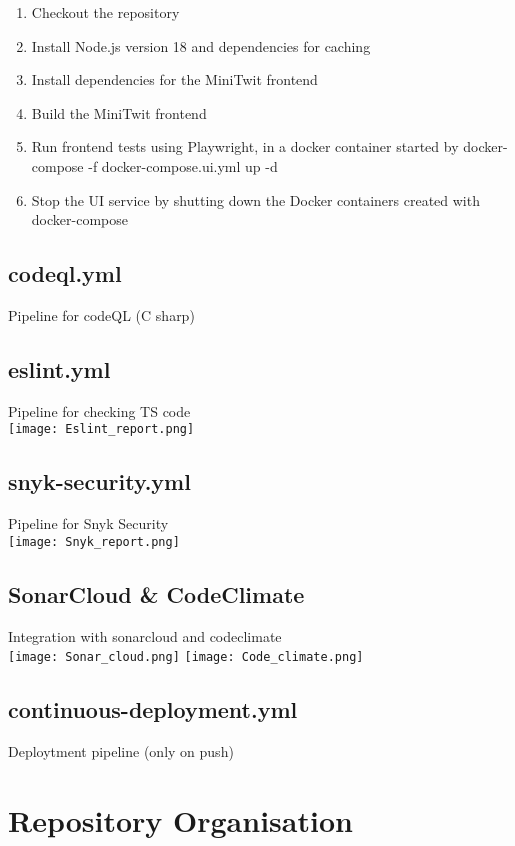 \begin{enumerate}
    \item Checkout the repository
    \item Install Node.js version 18 and dependencies for caching
    \item Install dependencies for the MiniTwit frontend
    \item Build the MiniTwit frontend
    \item Run frontend tests using Playwright, in a docker container started by docker-compose -f docker-compose.ui.yml up -d
    \item Stop the UI service by shutting down the Docker containers created with docker-compose
\end{enumerate}

\subsection{codeql.yml}
Pipeline for codeQL (C sharp) 

\subsection{eslint.yml}
Pipeline for checking TS code\\
\texttt{[image: Eslint\_report.png]}

\subsection{snyk-security.yml}
Pipeline for Snyk Security\\
\texttt{[image: Snyk\_report.png]}

\subsection{SonarCloud \& CodeClimate}
Integration with sonarcloud and codeclimate \\

\texttt{[image: Sonar\_cloud.png]}
\texttt{[image: Code\_climate.png]}

\subsection{continuous-deployment.yml}
Deploytment pipeline (only on push)\\

\section{Repository Organisation}

